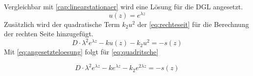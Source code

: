 Vergleichbar mit \cref{cap:linearstationaer} wird eine Lösung für die DGL angesetzt.
\begin{equation}\label{eq:angesetzteloesung}
	u(z)=e^{\lambda z}
\end{equation}
Zusätzlich wird der quadratische Term $k_2u^2$ der \cref{eq:rechteseit} für die Berechnung der rechten Seite hinzugefügt.
\begin{equation}\label{eq:quadritsche}
		D\cdot\lambda^2 e^{\lambda z}-ku(z)-k_2u^2=-s(z)
\end{equation}
Mit \cref{eq:angesetzteloesung} folgt für \cref{eq:quadritsche}

\begin{equation}\label{eq:quadritsche}
		D\cdot\lambda^2 e^{\lambda z}-ke^{\lambda z}-k_2e^{2\lambda z}=-s(z)
\end{equation}

